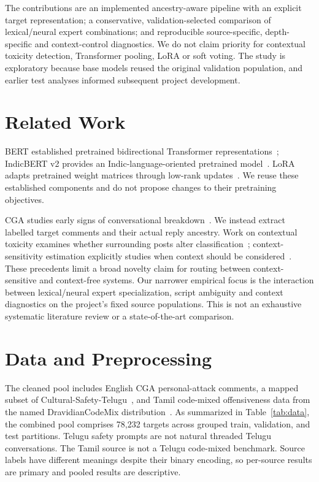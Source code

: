 \documentclass[11pt,a4paper]{article}
\begin{document}
The contributions are an implemented ancestry-aware pipeline with an explicit target representation; a conservative, validation-selected comparison of lexical/neural expert combinations; and reproducible source-specific, depth-specific and context-control diagnostics. We do not claim priority for contextual toxicity detection, Transformer pooling, LoRA or soft voting. The study is exploratory because base models reused the original validation population, and earlier test analyses informed subsequent project development.

\section{Related Work}
BERT established pretrained bidirectional Transformer representations~\citep{devlin2019}; IndicBERT v2 provides an Indic-language-oriented pretrained model~\citep{doddapaneni2023}. LoRA adapts pretrained weight matrices through low-rank updates~\citep{hu2021}. We reuse these established components and do not propose changes to their pretraining objectives.

CGA studies early signs of conversational breakdown~\citep{zhang2018}. We instead extract labelled target comments and their actual reply ancestry. Work on contextual toxicity examines whether surrounding posts alter classification~\citep{pavlopoulos2020}; context-sensitivity estimation explicitly studies when context should be considered~\citep{xenos2021}. These precedents limit a broad novelty claim for routing between context-sensitive and context-free systems. Our narrower empirical focus is the interaction between lexical/neural expert specialization, script ambiguity and context diagnostics on the project's fixed source populations. This is not an exhaustive systematic literature review or a state-of-the-art comparison.

\section{Data and Preprocessing}
The cleaned pool includes English CGA personal-attack comments, a mapped subset of Cultural-Safety-Telugu~\citep{telugucard}, and Tamil code-mixed offensiveness data from the named DravidianCodeMix distribution~\citep{tamilcard}. As summarized in Table~\ref{tab:data}, the combined pool comprises 78,232 targets across grouped train, validation, and test partitions. Telugu safety prompts are not natural threaded Telugu conversations. The Tamil source is not a Telugu code-mixed benchmark. Source labels have different meanings despite their binary encoding, so per-source results are primary and pooled results are descriptive.
\end{document}

